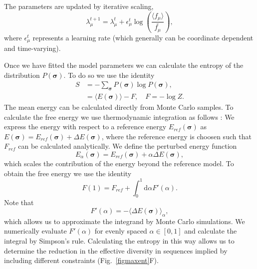 \documentclass[superscriptaddress,twocolumn,pre]{revtex4}
\newcommand{\B}{\boldsymbol}
\newcommand{\ud}{\mathrm{d}}
\newcommand{\<}{\langle}
\renewcommand{\>}{\rangle}
\begin{document}
The parameters are updated by iterative scaling,
\begin{equation}
    \lambda_\mu^{t+1} = \lambda_\mu^t + \epsilon_\mu^t \log \left( \frac{\langle f_\mu \rangle}{\bar{f_\mu}} \right),
\end{equation}
where $\epsilon_\mu^t$ represents a learning rate (which generally can be coordinate dependent and time-varying).

Once we have fitted the model parameters we can calculate the entropy of the distribution $P(\B \sigma)$. To do so we use the identity
\begin{align}
    S &= - \sum_{\B \sigma}  P(\B \sigma) \log P(\B \sigma),  \\
      &= \langle E(\B \sigma) \rangle - F, \quad F = - \log Z.
\end{align}
The mean energy can be calculated directly from Monte Carlo samples. To calculate the free energy we use thermodynamic integration as follows \cite{Marchi2019b}: We express the energy with respect to a reference energy $E_{ref}(\B \sigma)$ as $E(\B \sigma) = E_{ref}(\B \sigma) + \Delta E(\B\sigma)$, where the reference energy is choosen such that $F_{ref}$ can be calculated analytically. We define the perturbed energy function
\begin{equation}
    E_\alpha(\B \sigma) = E_{ref}(\B \sigma) + \alpha \Delta E(\B\sigma),
\end{equation}
which scales the contribution of the energy beyond the reference model.
To obtain the free energy we use the identity
\begin{equation}
    F(1) = F_{ref} + \int_0^1 \ud \alpha F'(\alpha).
\end{equation}
Note that
\begin{equation}
    F'(\alpha) = - \langle \Delta E(\B \sigma) \rangle_{\alpha},
\end{equation}
which allows us to approximate the integrand by Monte Carlo simulations. We numerically evaluate $F'(\alpha)$ for evenly spaced $\alpha \in [0, 1]$ and calculate the integral by Simpson's rule. Calculating the entropy in this way allows us to determine the reduction in the effective diversity in sequences implied by including different constraints (Fig.~\ref{figmaxent}F). 
\end{document}
